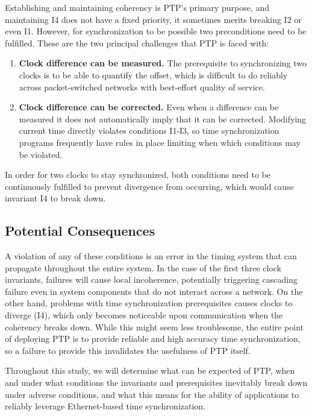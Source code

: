 Establishing and maintaining coherency is PTP's primary purpose, and maintaining I4 does not have a fixed priority, it sometimes merits breaking I2 or even I1. However, for synchronization to be possible two preconditions need to be fulfilled. These are the two principal challenges that PTP is faced with:

\begin{enumerate}[label=P\arabic*.]

    \item \textbf{Clock difference can be measured.} The prerequisite to synchronizing two clocks is to be able to quantify the offset, which is difficult to do reliably across packet-switched networks with best-effort quality of service.
    \item \textbf{Clock difference can be corrected.} Even when a difference can be measured it does not automatically imply that it can be corrected. Modifying current time directly violates conditions I1-I3, so time synchronization programs frequently have rules in place limiting when which conditions may be violated.
\end{enumerate}

In order for two clocks to stay synchronized, both conditions need to be continuously fulfilled to prevent divergence from occurring, which would cause invariant I4 to break down.

\subsection{Potential Consequences}
A violation of any of these conditions is an error in the timing system that can propagate throughout the entire system.
In the case of the first three clock invariants, failures will cause local incoherence, potentially triggering cascading failure even in system components that do not interact across a network. On the other hand, problems with time synchronization prerequisites causes clocks to diverge (I4), which only becomes noticeable upon communication when the coherency breaks down.
While this might seem less troublesome, the entire point of deploying PTP is to provide reliable and high accuracy time synchronization, so a failure to provide this invalidates the usefulness of PTP itself.

Throughout this study, we will determine what can be expected of PTP, when and under what conditions the invariants and prerequisites inevitably break down under adverse conditions, and what this means for the ability of applications to reliably leverage Ethernet-based time synchronization.

